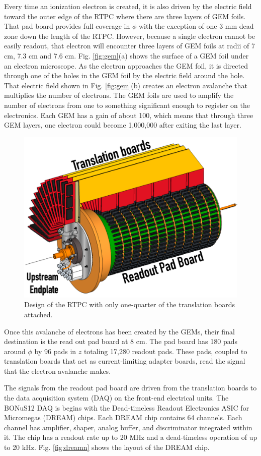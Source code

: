 Every time an ionization electron is created, it is also driven by the electric field toward the outer edge of the RTPC where there are three layers of GEM foils. That pad board provides full coverage in $\phi$ with the exception of one 3 mm dead zone down the length of the RTPC. However, because a single electron cannot be easily readout, that electron will encounter three layers of GEM foils at radii of 7 cm, 7.3 cm and 7.6 cm. Fig. \ref{fig:gem}(a) shows the surface of a GEM foil under an electron microscope. As the electron approaches the GEM foil, it is directed through one of the holes in the GEM foil by the electric field around the hole.\cite{GEM} That electric field shown in Fig. \ref{fig:gem}(b) creates an electron avalanche that multiplies the number of electrons. The GEM foils are used to amplify the number of electrons from one to something significant enough to register on the electronics. Each GEM has a gain of about 100, which means that through three GEM layers, one electron could become 1,000,000 after exiting the last layer.

\begin{figure}[h!]
	\centering
	\includegraphics[width=0.8\linewidth]{figures/rtpc_design.png}
	\caption{Design of the RTPC with only one-quarter of the translation boards attached.}
	\label{fig:rtpc_design}
\end{figure}

Once this avalanche of electrons has been created by the GEMs, their final destination is the read out pad board at 8 cm. The pad board has 180 pads around $\phi$ by 96 pads in $z$ totaling 17,280 readout pads. These pads, coupled to translation boards that act as current-limiting adapter boards, read the signal that the electron avalanche makes. 

The signals from the readout pad board are driven from the translation boards to the data acquisition system (DAQ) on the front-end electrical units. The BONuS12 DAQ is begins with the Dead-timeless Readout Electronics ASIC for Micromegas (DREAM) chips. Each DREAM chip contains 64 channels. Each channel has amplifier, shaper, analog buffer, and discriminator integrated within it. The chip has a readout rate up to 20 MHz and a dead-timeless operation of up to 20 kHz. Fig. \ref{fig:dreamn} shows the layout of the DREAM chip.

